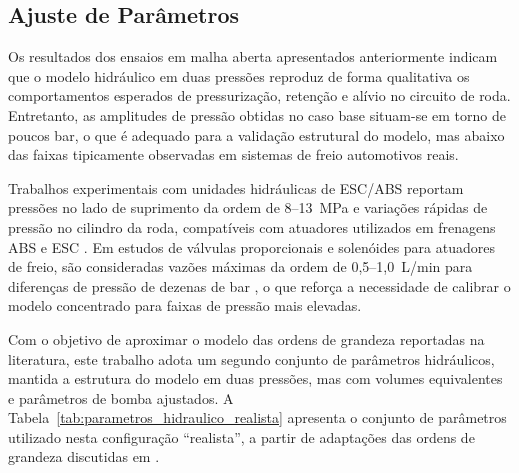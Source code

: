 \subsection{Ajuste de Parâmetros}
\label{sec:controle-ajuste-parametros-realistas}

Os resultados dos ensaios em malha aberta apresentados anteriormente indicam que o modelo hidráulico em duas pressões reproduz de forma qualitativa os comportamentos esperados de pressurização, retenção e alívio no circuito de roda. Entretanto, as amplitudes de pressão obtidas no caso base situam-se em torno de poucos bar, o que é adequado para a validação estrutural do modelo, mas abaixo das faixas tipicamente observadas em sistemas de freio automotivos reais.

Trabalhos experimentais com unidades hidráulicas de ESC/ABS reportam pressões no lado de suprimento da ordem de 8–13~MPa e variações rápidas de pressão no cilindro da roda, compatíveis com atuadores utilizados em frenagens ABS e ESC \cite{ZengYangHuang2023,DesignESCUnitTestSystem2018,HouhuaJing2022}. Em estudos de válvulas proporcionais e solenóides para atuadores de freio, são consideradas vazões máximas da ordem de 0,5–1{,}0~L/min para diferenças de pressão de dezenas de bar \cite{ProportionalPressureABS2023,ChenLv2017}, o que reforça a necessidade de calibrar o modelo concentrado para faixas de pressão mais elevadas.

Com o objetivo de aproximar o modelo das ordens de grandeza reportadas na literatura, este trabalho adota um segundo conjunto de parâmetros hidráulicos, mantida a estrutura do modelo em duas pressões, mas com volumes equivalentes e parâmetros de bomba ajustados. A Tabela~\ref{tab:parametros_hidraulico_realista} apresenta o conjunto de parâmetros utilizado nesta configuração ``realista'', a partir de adaptações das ordens de grandeza discutidas em .

